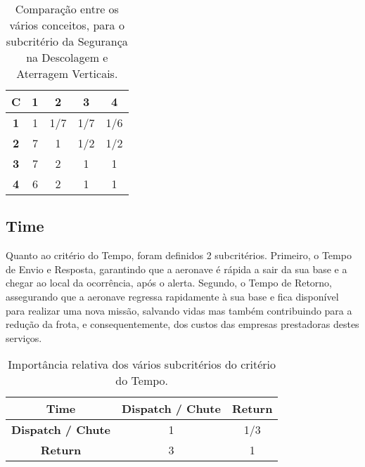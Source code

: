 \begin{table}[H]
\begin{center}
\caption{Comparação entre os vários conceitos, para o subcritério da Segurança na Descolagem e Aterragem Verticais.}
\begin{tabular}{ |c|c c c c| }
 \hline
 \textbf{C} & \textbf{1} & \textbf{2} & \textbf{3} & \textbf{4}  \\
\hline
 \textbf{1} & 1 & 1/7 & 1/7 & 1/6 \\
 \textbf{2} & 7 & 1 & 1/2 & 1/2  \\
 \textbf{3} & 7 & 2 & 1 & 1  \\
 \textbf{4} & 6 & 2 & 1 & 1  \\
\hline
\end{tabular}
\end{center}
\end{table}












\subsection{Time}

Quanto ao critério do Tempo, foram definidos 2 subcritérios. Primeiro, o Tempo de Envio e Resposta, garantindo que a aeronave é rápida a sair da sua base e a chegar ao local da ocorrência, após o alerta. Segundo, o Tempo de Retorno, assegurando que a aeronave regressa rapidamente à sua base e fica disponível para realizar uma nova missão, salvando vidas mas também contribuindo para a redução da frota, e consequentemente, dos custos das empresas prestadoras destes serviços.




\begin{table}[H]
\begin{center}
\caption{Importância relativa dos vários subcritérios do critério do Tempo.}
\begin{tabular}{ |c|c c| }
 \hline
 \textbf{Time} & \textbf{Dispatch / Chute} & \textbf{Return}  \\
\hline
 \textbf{Dispatch / Chute} & 1 & 1/3  \\
 \textbf{Return} & 3 & 1   \\
\hline
\end{tabular}
\end{center}
\end{table}

